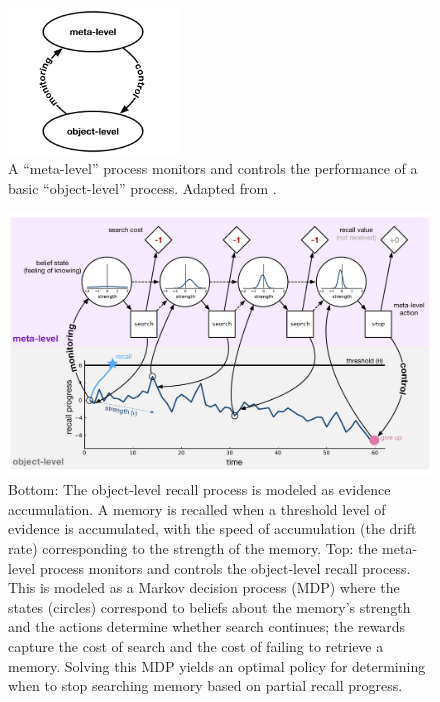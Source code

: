 \begin{figure}
  \centering
  \includegraphics[width=0.4\textwidth]{figs/memory/nelson.pdf}
  \caption{ A ``meta-level'' process monitors and controls the performance of a basic ``object-level'' process. Adapted from \citetnelson{}.}
  \label{fig:nelson}
\end{figure}


\begin{figure}[ht]
  \centering
  \includegraphics[width=\textwidth]{figs/memory/model.pdf}
  \caption{
    Bottom: The object-level recall process is modeled as evidence accumulation. A memory is recalled when a threshold level of evidence is accumulated, with the speed of accumulation (the drift rate) corresponding to the strength of the memory. Top: the meta-level process monitors and controls the object-level recall process. This is modeled as a Markov decision process (MDP) where the states (circles) correspond to beliefs about the memory's strength and the actions determine whether search continues; the rewards capture the cost of search and the cost of failing to retrieve a memory. Solving this MDP yields an optimal policy for determining when to stop searching memory based on partial recall progress.}
  \label{fig:model-diagram}
\end{figure}

